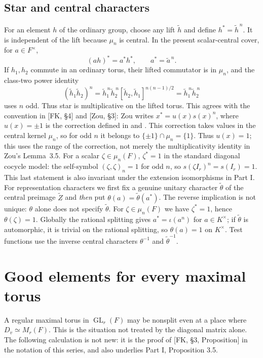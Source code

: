 \documentclass[11pt]{article}
\newcommand{\GL}{\operatorname{GL}}
\newcommand{\tZ}{\widetilde Z}
\theoremstyle{plain}
\theoremstyle{definition}
\begin{document}
\subsection{Star and central characters}\label{subsec:star}
For an element $h$ of the ordinary group, choose any lift
$\widetilde h$ and define $h^*=\widetilde h^{\,n}$.  It is
independent of the lift because $\mu_n$ is central.  In the present
scalar-central cover, for $a\in F^\times$,
\begin{equation}\label{eq:starcentral}
 (ah)^*=a^*h^*,\qquad a^*=\widetilde a^{\,n}.
\end{equation}
If $h_1,h_2$ commute in an ordinary torus, their lifted commutator
is in $\mu_n$, and the class-two power identity
\begin{equation}\label{eq:starpower}
 (\widetilde h_1\widetilde h_2)^n
 =\widetilde h_1^{\,n}\widetilde h_2^{\,n}
 [\widetilde h_2,\widetilde h_1]^{n(n-1)/2}
 =\widetilde h_1^{\,n}\widetilde h_2^{\,n}
\end{equation}
uses $n$ odd.  Thus star is multiplicative on the lifted torus.
This agrees with the convention in [FK, \S4] and [Zou, \S3]:
Zou writes $x^*=u(x)s(x)^n$, where $u(x)=\pm1$ is the
correction defined in \cite[\S4]{FK} and \cite[\S3.1]{Zou24}.
This correction takes values in the central kernel $\mu_n$, so
for odd $n$ it belongs to $\{\pm1\}\cap\mu_n=\{1\}$.
Thus $u(x)=1$; this uses the range of the correction, not merely
the multiplicativity identity in Zou's Lemma~3.5.  For a scalar $\zeta\in\mu_n(F)$,
$\zeta^*=1$ in the standard diagonal cocycle model: the
self-symbol $(\zeta,\zeta)_n=1$ for odd $n$, so
$s(\zeta I_r)^n=s(I_r)=1$.  This last statement is also
invariant under the extension isomorphisms in Part I.
For representation characters we first fix a genuine unitary
character $\widetilde\theta$ of the central preimage $\tZ$ and
\emph{then} put $\theta(a)=\widetilde\theta(a^*)$.
The reverse implication is not unique: $\theta$ alone does not
specify $\widetilde\theta$.  For $\zeta\in\mu_n(F)$ we have
$\zeta^*=1$, hence $\theta(\zeta)=1$.  Globally the rational
splitting gives $a^*=\iota(a^n)$ for $a\in K^\times$;
if $\widetilde\theta$ is automorphic, it is trivial on the rational
splitting, so $\theta(a)=1$ on $K^\times$.
Test functions use the inverse central characters
$\theta^{-1}$ and $\widetilde\theta^{-1}$.

\section{Good elements for every maximal torus}\label{sec:good}
A regular maximal torus in $\GL_r(F)$ may be nonsplit even at a
place where $D_v\simeq M_r(F)$.  This is the situation not treated by
the diagonal matrix alone.  The following calculation is not new:
it is the proof of [FK, \S3, Proposition] in the notation of this
series, and also underlies Part I, Proposition 3.5.
\end{document}
